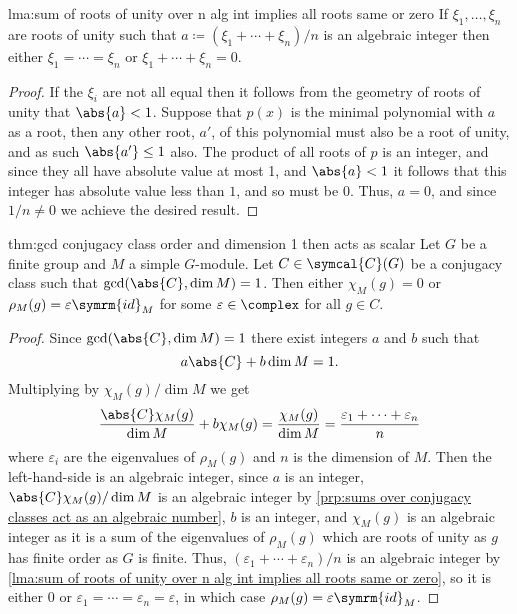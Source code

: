 \documentclass[fleqn]{NotesClass}
\newcommand{\id}{\symrm{id}}
\newcommand{\conjugacyClasses}{\symcal{C}}
\begin{document}
    \begin{lma}{}{lma:sum of roots of unity over n alg int implies all roots same or zero}
        If \(\xi_1, \dotsc, \xi_n\) are roots of unity such that \(a \coloneq (\xi_1 + \dotsb + \xi_n)/n\) is an algebraic integer then either \(\xi_1 = \dotsb = \xi_n\) or \(\xi_1 + \dotsb + \xi_n = 0\).
        \begin{proof}
            If the \(\xi_i\) are not all equal then it follows from the geometry of roots of unity that \(\abs{a} < 1\).
            Suppose that \(p(x)\) is the minimal polynomial with \(a\) as a root, then any other root, \(a'\), of this polynomial must also be a root of unity, and as such \(\abs{a'} \le 1\) also.
            The product of all roots of \(p\) is an integer, and since they all have absolute value at most 1, and \(\abs{a} < 1\) it follows that this integer has absolute value less than \(1\), and so must be \(0\).
            Thus, \(a = 0\), and since \(1/n \ne 0\) we achieve the desired result.
        \end{proof}
    \end{lma}
    
    \begin{thm}{}{thm:gcd conjugacy class order and dimension 1 then acts as scalar}
        Let \(G\) be a finite group and \(M\) a simple \(G\)-module.
        Let \(C \in \conjugacyClasses(G)\) be a conjugacy class such that \(\gcd(\abs{C}, \dim M) = 1\).
        Then either \(\chi_M(g) = 0\) or \(\rho_M(g) = \varepsilon\id_M\) for some \(\varepsilon \in \complex\) for all \(g \in C\).
        \begin{proof}
            Since \(\gcd(\abs{C}, \dim M) = 1\) there exist integers \(a\) and \(b\) such that
            \begin{equation}
                a \abs{C} + b \dim M = 1.
            \end{equation}
            Multiplying by \(\chi_M(g)/\dim M\) we get
            \begin{equation}
                \frac{\abs{C}\chi_M(g)}{\dim M} + b \chi_M(g) = \frac{\chi_M(g)}{\dim M} = \frac{\varepsilon_1 + \dotsb + \varepsilon_n}{n}
            \end{equation}
            where \(\varepsilon_i\) are the eigenvalues of \(\rho_M(g)\) and \(n\) is the dimension of \(M\).
            Then the left-hand-side is an algebraic integer, since \(a\) is an integer, \(\abs{C}\chi_M(g)/\dim M\) is an algebraic integer by \cref{prp:sums over conjugacy classes act as an algebraic number}, \(b\) is an integer, and \(\chi_M(g)\) is an algebraic integer as it is a sum of the eigenvalues of \(\rho_M(g)\) which are roots of unity as \(g\) has finite order as \(G\) is finite.
            Thus, \((\varepsilon_1 + \dotsb + \varepsilon_n)/n\) is an algebraic integer by \cref{lma:sum of roots of unity over n alg int implies all roots same or zero}, so it is either \(0\) or \(\varepsilon_1 = \dotsb = \varepsilon_n = \varepsilon\), in which case \(\rho_M(g) = \varepsilon \id_M\).
        \end{proof}
    \end{thm}
    
\end{document}
